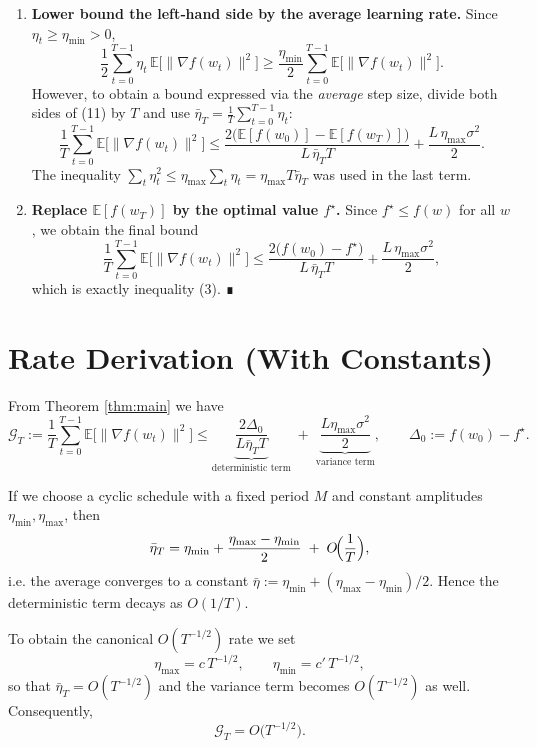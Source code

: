 \documentclass{article}
\begin{document}
\begin{enumerate}[label=[Step \arabic*], leftmargin=*]
\item \textbf{Lower bound the left‑hand side by the average learning rate.}  
Since $\eta_{t}\ge\eta_{\min}>0$,
\[
\frac{1}{2}\sum_{t=0}^{T-1}\eta_{t}\,
\mathbb{E}\!\bigl[\|\nabla f(w_{t})\|^{2}\bigr]
\ge
\frac{\eta_{\min}}{2}\sum_{t=0}^{T-1}
\mathbb{E}\!\bigl[\|\nabla f(w_{t})\|^{2}\bigr].
\tag{12}
\]
However, to obtain a bound expressed via the \emph{average} step size,
divide both sides of (11) by $T$ and use $\bar\eta_{T}=\frac1T\sum_{t=0}^{T-1}\eta_{t}$:
\[
\frac{1}{T}\sum_{t=0}^{T-1}\mathbb{E}\!\bigl[\|\nabla f(w_{t})\|^{2}\bigr]
\le
\frac{2\bigl(\mathbb{E}[f(w_{0})]-\mathbb{E}[f(w_{T})]\bigr)}{L\,\bar\eta_{T}T}
+\frac{L\,\eta_{\max}\sigma^{2}}{2}.
\tag{13}
\]
The inequality $\sum_{t}\eta_{t}^{2}\le \eta_{\max}\sum_{t}\eta_{t}
=\eta_{\max}T\bar\eta_{T}$ was used in the last term.

\item \textbf{Replace $\mathbb{E}[f(w_{T})]$ by the optimal value $f^{\star}$.}  
Since $f^{\star}\le f(w)$ for all $w$, we obtain the final bound
\[
\frac{1}{T}\sum_{t=0}^{T-1}\mathbb{E}\!\bigl[\|\nabla f(w_{t})\|^{2}\bigr]
\le
\frac{2\bigl(f(w_{0})-f^{\star}\bigr)}{L\,\bar\eta_{T}T}
+\frac{L\,\eta_{\max}\sigma^{2}}{2},
\]
which is exactly inequality (3).  ∎
\end{enumerate}

\section*{Rate Derivation (With Constants)}
From Theorem \ref{thm:main} we have
\[
\mathcal{G}_{T}:=
\frac{1}{T}\sum_{t=0}^{T-1}\mathbb{E}\!\bigl[\|\nabla f(w_{t})\|^{2}\bigr]
\le
\underbrace{\frac{2\Delta_{0}}{L\bar\eta_{T}T}}_{\text{deterministic term}}
\;+\;
\underbrace{\frac{L\eta_{\max}\sigma^{2}}{2}}_{\text{variance term}},
\qquad
\Delta_{0}:=f(w_{0})-f^{\star}.
\]

If we choose a cyclic schedule with a fixed period $M$ and constant
amplitudes $\eta_{\min},\eta_{\max}$, then
\[
\bar\eta_{T}= \eta_{\min}+\frac{\eta_{\max}-\eta_{\min}}{2}
\;+\;O\!\Bigl(\frac{1}{T}\Bigr),
\]
i.e. the average converges to a constant $\bar\eta:=\eta_{\min}+(\eta_{\max}-\eta_{\min})/2$.
Hence the deterministic term decays as $O(1/T)$.

To obtain the canonical $O(T^{-1/2})$ rate we set
\[
\eta_{\max}=c\,T^{-1/2},\qquad \eta_{\min}=c'\,T^{-1/2},
\]
so that $\bar\eta_{T}=O(T^{-1/2})$ and the variance term becomes $O(T^{-1/2})$ as well.
Consequently,
\[
\mathcal{G}_{T}=O\!\bigl(T^{-1/2}\bigr).
\]
\end{document}
